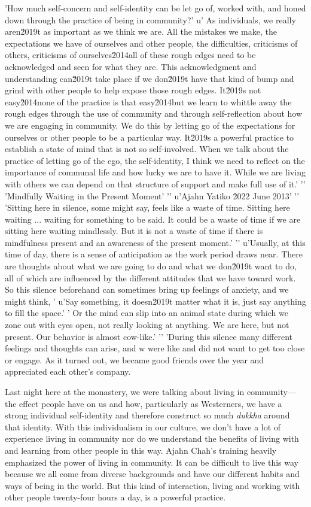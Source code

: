 'How much self-concern and self-identity can be let go of, worked with, and honed down through the practice of being in community?'
u' As individuals, we really aren\u2019t as important as we think we are. All the mistakes we make, the expectations we have of ourselves and other people, the difficulties, criticisms of others, criticisms of ourselves\u2014all of these rough edges need to be acknowledged and seen for what they are. This acknowledgment and understanding can\u2019t take place if we don\u2019t have that kind of bump and grind with other people to help expose those rough edges. It\u2019s not easy\u2014none of the practice is that easy\u2014but we learn to whittle away the rough edges through the use of community and through self-reflection about how we are engaging in community. We do this by letting go of the expectations for ourselves or other people to be a particular way. It\u2019s a powerful practice to establish a state of mind that is not so self-involved. When we talk about the practice of letting go of the ego, the self-identity, I think we need to reflect on the importance of communal life and how lucky we are to have it. While we are living with others we can depend on that structure of support and make full use of it.'
'\n'
'Mindfully Waiting in the Present Moment'
'\n'
u'Ajahn Yatiko \u2022 June 2013'
'\n'
'Sitting here in silence, some might say, feels like a waste of time. Sitting here waiting ... waiting for something to be said. It could be a waste of time if we are sitting here waiting mindlessly. But it is not a waste of time if there is mindfulness present and an awareness of the present moment.'
'\n'
u'Usually, at this time of day, there is a sense of anticipation as the work period draws near. There are thoughts about what we are going to do and what we don\u2019t want to do, all of which are influenced by the different attitudes that we have toward work. So this silence beforehand can sometimes bring up feelings of anxiety, and we might think, '
u'Say something, it doesn\u2019t matter what it is, just say anything to fill the space.'
' Or the mind can slip into an animal state during which we zone out with eyes open, not really looking at anything. We are here, but not present. Our behavior is almost cow-like.'
'\n'
'During this silence many different feelings and thoughts can arise, and w were like and 
did not want to get too close or engage. As it turned out, we became 
good friends over the year and appreciated each other's company.

Last night here at the monastery, we were talking about living in 
community---the effect people have on us and how, particularly as 
Westerners, we have a strong individual self-identity and therefore 
construct so much \emph{dukkha} around that identity. With this 
individualism in our culture, we don't have a lot of experience living 
in community nor do we understand the benefits of living with and 
learning from other people in this way. Ajahn Chah's training heavily 
emphasized the power of living in community. It can be difficult to 
live this way because we all come from diverse backgrounds and have our 
different habits and ways of being in the world. But this kind of 
interaction, living and working with other people twenty-four hours a 
day, is a powerful practice.

